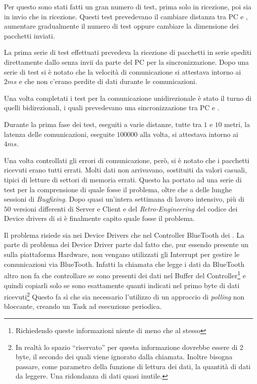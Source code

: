 Per questo sono stati fatti un gran numero di test, prima solo in
ricezione, poi sia in invio che in ricezione. Questi test prevedevano il
cambiare distanza tra PC e \SPAM{}, aumentare gradualmente il numero di
test oppure cambiare la dimensione dei pacchetti inviati.

La prima serie di test effettuati prevedeva la ricezione di pacchetti in
serie spediti direttamente dallo \SPAM{} senza invii da parte del PC per la
sincronizzazione. Dopo una serie di test si è notato che la velocità di
comunicazione si attestava intorno ai $2ms$ e che non c'erano perdite di
dati durante le comunicazioni.

Una volta completati i test per la comunicazione unidirezionale è stato il
turno di quelli bidirezionali, i quali prevedevano una sincronizzazione tra
PC e \SPAM{}.

Durante la prima fase dei test, eseguiti a varie distanze, tutte tra $1$ e
$10$ metri, la latenza delle comunicazioni, eseguite $100000$ alla volta, si
attestava intorno ai $4ms$.

Una volta controllati gli errori di comunicazione, però, si è notato che i
pacchetti ricevuti erano tutti errati. Molti dati non arrivavano,
sostituiti da valori casuali, tipici di letture di settori di memoria
errati. Questo ha portato ad una serie di test per la comprensione di quale
fosse il problema, oltre che a delle lunghe sessioni di \emph{Bugfixing}.
Dopo quasi un'intera settimana di lavoro intensivo, più di $50$ versioni
differenti di Server e Client e del \emph{Retro-Engineering} del codice dei
Device drivers di \nxtOSEK{} si è finalmente capito quale fosse il
problema.

Il problema risiede sia nei Device Drivers che nel Controller BlueTooth
dei \nxt{}. La parte di problema dei Device Driver parte dal fatto che, pur
essendo presente un  sulla piattaforma Hardware, non vengano
utilizzati gli Interrupt per gestire le comunicazioni via BlueTooth.
Infatti la chiamata che legge i dati da BlueTooth altro non fa che
controllare se sono presenti dei dati nel Buffer del
Controller\footnote{Richiedendo queste informazioni niente di meno che al
 stesso} e quindi copiarli solo se sono esattamente quanti
indicati nel primo byte di dati ricevuti\footnote{In realtà lo spazio
``riservato'' per questa informazione dovrebbe essere di 2 byte, il secondo
dei quali viene ignorato dalla chiamata. Inoltre bisogna passare, come
parametro della funzione di lettura dei dati, la quantità di dati da
leggere. Una ridondanza di dati quasi inutile.} Questo fa sì che sia
necessario l'utilizzo di un approccio di \emph{polling} non bloccante,
creando un Task ad esecuzione periodica.

